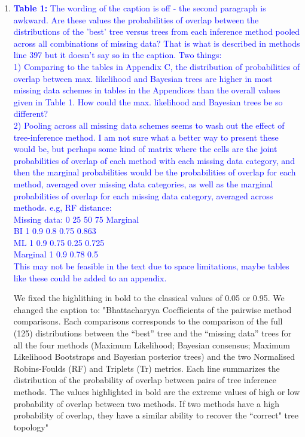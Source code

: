 \documentclass[12pt,letterpaper]{article}
\begin{document}
\begin{enumerate}
\item{\textcolor{blue}{\textbf{Table 1:} The wording of the caption is off - the second paragraph is awkward. 
Are these values the probabilities of overlap between the distributions of the 'best' tree versus trees from each inference method pooled across all combinations of missing data? That is what is described in methods line 397 but it doesn't say so in the caption.
Two things:\\
1)  Comparing to the tables in Appendix C, the distribution of probabilities of overlap between max. likelihood and Bayesian trees are higher in most missing data schemes in tables in the Appendices than the overall values given in Table 1. How could the max. likelihood and Bayesian trees be so different?\\
2)  Pooling across all missing data schemes seems to wash out the effect of tree-inference method. I am not sure what a better way to present these would be, but perhaps some kind of matrix where the cells are the joint probabilities of overlap of each method with each missing data category, and then the marginal probabilities would be the probabilities of overlap for each method, averaged over missing data categories, as well as the marginal probabilities of overlap for each missing data category, averaged across methods.  e.g, RF distance:\\
Missing data:   0   25  50  75  Marginal \\
BI  1   0.9 0.8 0.75    0.863 \\
ML  1   0.9 0.75    0.25    0.725 \\
Marginal    1   0.9 0.78    0.5  \\
This may not be feasible in the text due to space limitations, maybe tables like these could be added to an appendix.}}

We fixed the highlithing in bold to the classical values of 0.05 or 0.95.
We changed the caption to:
"Bhattacharyya Coefficients of the pairwise method comparisons.
Each comparisons corresponds to the comparison of the full (125) distributions between the ``best'' tree and the ``missing data'' trees for all the four methods (Maximum Likelihood; Bayesian consensus; Maximum Likelihood Bootstraps and Bayesian posterior trees) and the two Normalised Robins-Foulds (RF) and Triplets (Tr) metrics. Each line summarizes the distribution of the probability of overlap between pairs of tree inference methods. The values highlighted in bold are the extreme values of high or low probability of overlap between two methods. If two methods have a high probability of overlap, they have a similar ability to recover the ``correct" tree topology"


\end{enumerate}
\end{document}
